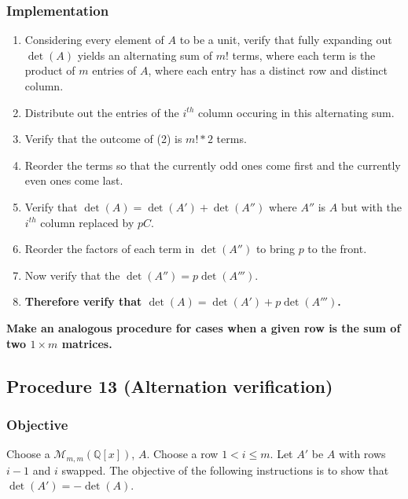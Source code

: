 \documentclass[twocolumn]{article}
\begin{document}
			\subsubsection{Implementation}
				\begin{enumerate}
					\item Considering every element of $A$ to be a unit, verify that fully expanding out $\det(A)$ yields an alternating sum of $m!$ terms, where each term is the product of $m$ entries of $A$, where each entry has a distinct row and distinct column.
					\item Distribute out the entries of the $i^{th}$ column occuring in this alternating sum.
					\item Verify that the outcome of (2) is $m!*2$ terms.
					\item Reorder the terms so that the currently odd ones come first and the currently even ones come last.
					\item Verify that $\det(A)=\det(A') + \det(A'')$ where $A''$ is $A$ but with the $i^{th}$ column replaced by $pC$.
					\item Reorder the factors of each term in $\det(A'')$ to bring $p$ to the front.
					\item Now verify that the $\det(A'')=p\det(A''')$.
					\item \textbf{Therefore verify that $\det(A)=\det(A') + p\det(A''')$.}
				\end{enumerate}
			\textbf{Make an analogous procedure for cases when a given row is the sum of two $1\times m$ matrices.}
		\subsection{Procedure 13 (Alternation verification)}\label{sec:procedure 13}
			\subsubsection{Objective}
				Choose a $\mathcal{M}_{m,m}(\mathbb{Q}[x])$, $A$. Choose a row $1<i\le m$. Let $A'$ be $A$ with rows $i-1$ and $i$ swapped. The objective of the following instructions is to show that $\det(A')=-\det(A)$.
\end{document}
